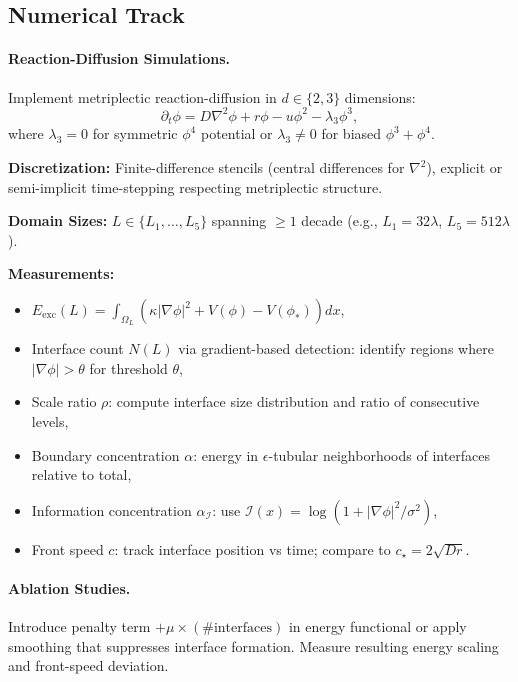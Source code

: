 \documentclass{article}
\begin{document}
\subsection*{Numerical Track}

\paragraph{Reaction-Diffusion Simulations.}
Implement metriplectic reaction-diffusion in $d \in \{2,3\}$ dimensions:
\begin{equation}
\partial_t \phi = D\nabla^2 \phi + r\phi - u\phi^2 - \lambda_3 \phi^3,
\end{equation}
where $\lambda_3 = 0$ for symmetric $\phi^4$ potential or $\lambda_3 \neq 0$ for biased $\phi^3 + \phi^4$.

\textbf{Discretization:} Finite-difference stencils (central differences for $\nabla^2$), explicit or semi-implicit time-stepping respecting metriplectic structure.

\textbf{Domain Sizes:} $L \in \{L_1, \ldots, L_5\}$ spanning $\geq 1$ decade (e.g., $L_1 = 32\lambda$, $L_5 = 512\lambda$).

\textbf{Measurements:}
\begin{itemize}[noitemsep]
\item $E_{\text{exc}}(L) = \int_{\Omega_L} \left( \kappa |\nabla\phi|^2 + V(\phi) - V(\phi_\ast) \right) dx$,
\item Interface count $N(L)$ via gradient-based detection: identify regions where $|\nabla\phi| > \theta$ for threshold $\theta$,
\item Scale ratio $\rho$: compute interface size distribution and ratio of consecutive levels,
\item Boundary concentration $\alpha$: energy in $\epsilon$-tubular neighborhoods of interfaces relative to total,
\item Information concentration $\alpha_{\mathcal{I}}$: use $\mathcal{I}(x) = \log(1 + |\nabla\phi|^2/\sigma^2)$,
\item Front speed $c$: track interface position vs time; compare to $c_\star = 2\sqrt{Dr}$.
\end{itemize}

\paragraph{Ablation Studies.}
Introduce penalty term $+\mu \times (\#\text{interfaces})$ in energy functional or apply smoothing that suppresses interface formation. Measure resulting energy scaling and front-speed deviation.
\end{document}
